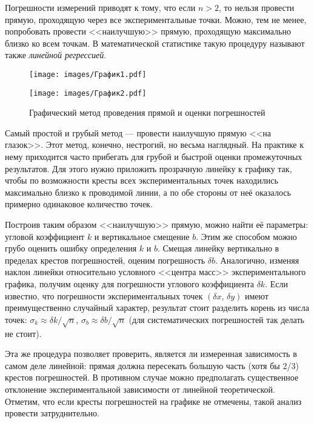 Погрешности измерений приводят к тому, что если $n>2$, то нельзя
провести прямую, проходящую через все экспериментальные точки. Можно,
тем не менее, попробовать провести <<наилучшую>>
прямую, проходящую максимально близко ко всем точкам. В математической
статистике такую процедуру называют также \emph{линейной регрессией}.

\begin{figure}[th]
\begin{minipage}[t]{0.5\columnwidth}%
\texttt{[image: images/График1.pdf]}%
\end{minipage}%
\begin{minipage}[t]{0.5\columnwidth}%
\texttt{[image: images/График2.pdf]}%
\end{minipage}

\caption{Графический метод проведения прямой и оценки погрешностей}
\end{figure}

Самый простой и грубый метод --- провести наилучшую прямую
<<на глазок>>. Этот метод, конечно, нестрогий,
но весьма наглядный. На практике к нему приходится часто прибегать
для грубой и быстрой оценки промежуточных результатов. Для этого нужно
приложить прозрачную линейку к графику так, чтобы по возможности кресты
всех экспериментальных точек находились максимально близко к проводимой
линии, а по обе стороны от неё оказалось примерно одинаковое количество
точек. 


Построив таким образом <<наилучшую>> прямую,
можно найти её параметры: угловой коэффициент $k$ и вертикальное
смещение $b$. Этим же способом можно грубо оценить ошибку определения
$k$ и $b$. Смещая линейку вертикально в пределах крестов погрешностей,
оценим погрешность $\delta b$. Аналогично, изменяя наклон линейки
относительно условного <<центра масс>>
экспериментального графика, получим оценку для погрешности углового
коэффициента $\delta k$. Если известно, что погрешности экспериментальных
точек $\left(\delta x,\,\delta y\right)$ имеют преимущественно случайный
характер, результат стоит разделить корень из числа точек: $\sigma_{k}\approx\delta k/\sqrt{n}$,
$\sigma_{b}\approx\delta b/\sqrt{n}$ (для систематических погрешностей
так делать не стоит).

Эта же процедура позволяет проверить, является ли измеренная зависимость
в самом деле линейной: прямая должна пересекать большую часть (хотя
бы 2/3) крестов погрешностей. В противном случае можно предполагать
существенное отклонение экспериментальной зависимости от линейной
теоретической. Отметим, что если кресты погрешностей на графике не
отмечены, такой анализ провести затруднительно. 

